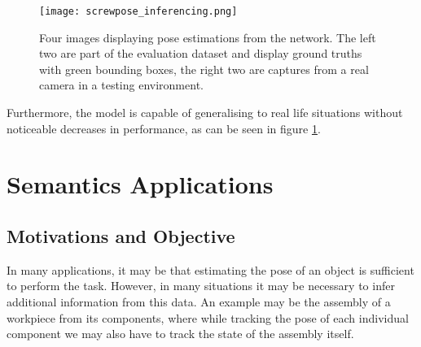 \begin{figure}[ht]
    \texttt{[image: screwpose\_inferencing.png]}
    \caption{Four images displaying pose estimations from the network. The left two are part of the evaluation dataset and display ground truths with green bounding boxes, the right two are captures from a real camera in a testing environment.}
    \label{fig:screwpose_inferencing}
\end{figure}

Furthermore, the model is capable of generalising to real life situations without noticeable decreases in performance, as can be seen in figure \ref{fig:screwpose_inferencing}.

\section{Semantics Applications}

\subsection{Motivations and Objective}

In many applications, it may be that estimating the pose of an object is sufficient to perform the task. However, in many situations it may be necessary to infer additional information from this data. An example may be the assembly of a workpiece from its components, where while tracking the pose of each individual component we may also have to track the state of the assembly itself.